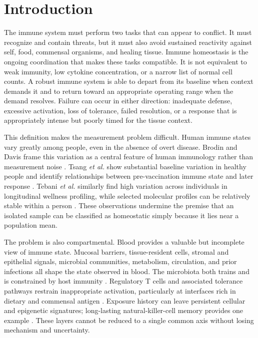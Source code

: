 \documentclass[conference]{IEEEtran}
\begin{document}
\section{Introduction}

The immune system must perform two tasks that can appear to conflict. It must recognize and contain threats, but it must also avoid sustained reactivity against self, food, commensal organisms, and healing tissue. Immune homeostasis is the ongoing coordination that makes these tasks compatible. It is not equivalent to weak immunity, low cytokine concentration, or a narrow list of normal cell counts. A robust immune system is able to depart from its baseline when context demands it and to return toward an appropriate operating range when the demand resolves. Failure can occur in either direction: inadequate defense, excessive activation, loss of tolerance, failed resolution, or a response that is appropriately intense but poorly timed for the tissue context.

This definition makes the measurement problem difficult. Human immune states vary greatly among people, even in the absence of overt disease. Brodin and Davis frame this variation as a central feature of human immunology rather than measurement noise \cite{brodin2017}. Tsang \emph{et al.} show substantial baseline variation in healthy people and identify relationships between pre-vaccination immune state and later response \cite{tsang2014}. Tebani \emph{et al.} similarly find high variation across individuals in longitudinal wellness profiling, while selected molecular profiles can be relatively stable within a person \cite{tebani2020}. These observations undermine the premise that an isolated sample can be classified as homeostatic simply because it lies near a population mean.

The problem is also compartmental. Blood provides a valuable but incomplete view of immune state. Mucosal barriers, tissue-resident cells, stromal and epithelial signals, microbial communities, metabolism, circulation, and prior infections all shape the state observed in blood. The microbiota both trains and is constrained by host immunity \cite{belkaid2014,zheng2020,pickard2017}. Regulatory T cells and associated tolerance pathways restrain inappropriate activation, particularly at interfaces rich in dietary and commensal antigen \cite{izcue2006}. Exposure history can leave persistent cellular and epigenetic signatures; long-lasting natural-killer-cell memory provides one example \cite{ruckert2022}. These layers cannot be reduced to a single common axis without losing mechanism and uncertainty.
\end{document}
